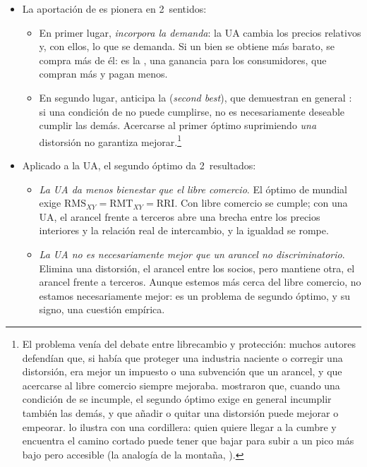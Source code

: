\documentclass[11pt]{article}
\begin{document}
\begin{itemize}
\item La aportación de  es pionera en 2~sentidos:
  \begin{itemize}
  \item En primer lugar, \textcite{Meade1955Customs} \emph{incorpora la demanda}: la UA cambia los precios relativos y, con ellos, lo que se demanda. Si un bien se obtiene más barato, se compra más de él: es la , una ganancia para los consumidores, que compran más y pagan menos.
  \item En segundo lugar, anticipa la  (\emph{second best})\nocite{Meade1955Trade}, que \textcite{LipseyLancaster1956General} demuestran en general : si una condición de  no puede cumplirse, no es necesariamente deseable cumplir las demás. Acercarse al primer óptimo suprimiendo \emph{una} distorsión no garantiza mejorar.\footnote{El problema venía del debate entre librecambio y protección: muchos autores defendían que, si había que proteger una industria naciente o corregir una distorsión, era mejor un impuesto o una subvención que un arancel, y que acercarse al libre comercio siempre mejoraba. \textcite{LipseyLancaster1956General} mostraron que, cuando una condición de  se incumple, el segundo óptimo exige en general incumplir también las demás, y que añadir o quitar una distorsión puede mejorar o empeorar. \textcite{Gandolfo2014International} lo ilustra con una cordillera: quien quiere llegar a la cumbre y encuentra el camino cortado puede tener que bajar para subir a un pico más bajo pero accesible (la analogía de la montaña, ).}
  \end{itemize}
\item Aplicado a la UA, el segundo óptimo da 2~resultados:
  \begin{itemize}
  \item \emph{La UA da menos bienestar que el libre comercio}. El óptimo de  mundial exige $\mathrm{RMS}_{XY}=\mathrm{RMT}_{XY}=\mathrm{RRI}$. Con libre comercio se cumple; con una UA, el arancel frente a terceros abre una brecha entre los precios interiores y la relación real de intercambio, y la igualdad se rompe.
  \item \emph{La UA no es necesariamente mejor que un arancel no discriminatorio}. Elimina una distorsión, el arancel entre los socios, pero mantiene otra, el arancel frente a terceros. Aunque estemos más cerca del libre comercio, no estamos necesariamente mejor: es un problema de segundo óptimo, y su signo, una cuestión empírica.
  \end{itemize}
\end{itemize}
\end{document}
